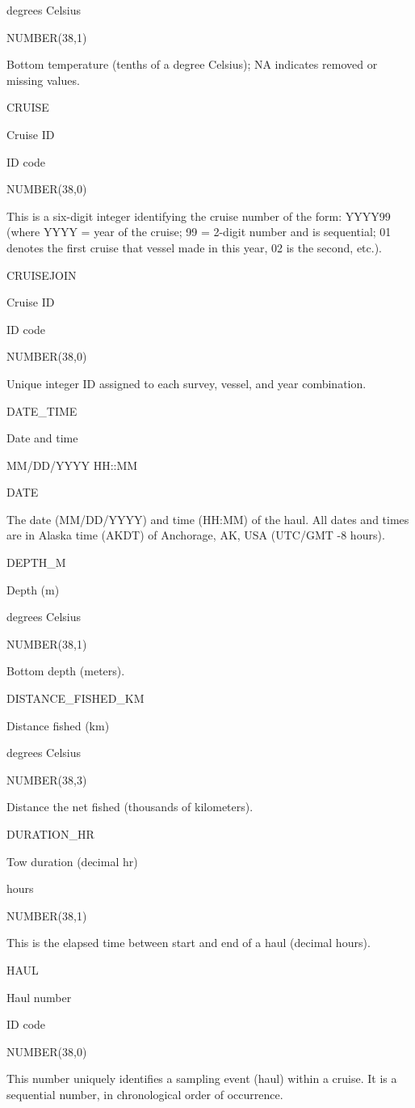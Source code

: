 \documentclass[
  letterpaper,
  oneside,
  open=any]{scrbook}
\begin{document}
degrees Celsius

NUMBER(38,1)

Bottom temperature (tenths of a degree Celsius); NA indicates removed or
missing values.

CRUISE

Cruise ID

ID code

NUMBER(38,0)

This is a six-digit integer identifying the cruise number of the form:
YYYY99 (where YYYY = year of the cruise; 99 = 2-digit number and is
sequential; 01 denotes the first cruise that vessel made in this year,
02 is the second, etc.).

CRUISEJOIN

Cruise ID

ID code

NUMBER(38,0)

Unique integer ID assigned to each survey, vessel, and year combination.

DATE\_TIME

Date and time

MM/DD/YYYY HH::MM

DATE

The date (MM/DD/YYYY) and time (HH:MM) of the haul. All dates and times
are in Alaska time (AKDT) of Anchorage, AK, USA (UTC/GMT -8 hours).

DEPTH\_M

Depth (m)

degrees Celsius

NUMBER(38,1)

Bottom depth (meters).

DISTANCE\_FISHED\_KM

Distance fished (km)

degrees Celsius

NUMBER(38,3)

Distance the net fished (thousands of kilometers).

DURATION\_HR

Tow duration (decimal hr)

hours

NUMBER(38,1)

This is the elapsed time between start and end of a haul (decimal
hours).

HAUL

Haul number

ID code

NUMBER(38,0)

This number uniquely identifies a sampling event (haul) within a cruise.
It is a sequential number, in chronological order of occurrence.
\end{document}

